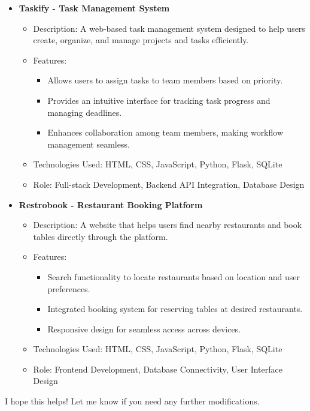 \documentclass[11pt]{article}
\begin{document}
\begin{itemize}
\item \textbf{Taskify - Task Management System}
  \begin{itemize}
  \item Description: A web-based task management system designed to help users create, organize, and manage projects and tasks efficiently.
  \item Features:
    \begin{itemize}
    \item Allows users to assign tasks to team members based on priority.
    \item Provides an intuitive interface for tracking task progress and managing deadlines.
    \item Enhances collaboration among team members, making workflow management seamless.
    \end{itemize}
  \item Technologies Used: HTML, CSS, JavaScript, Python, Flask, SQLite
  \item Role: Full-stack Development, Backend API Integration, Database Design
  \end{itemize}

\item \textbf{Restrobook - Restaurant Booking Platform}
  \begin{itemize}
  \item Description: A website that helps users find nearby restaurants and book tables directly through the platform.
  \item Features:
    \begin{itemize}
    \item Search functionality to locate restaurants based on location and user preferences.
    \item Integrated booking system for reserving tables at desired restaurants.
    \item Responsive design for seamless access across devices.
    \end{itemize}
  \item Technologies Used: HTML, CSS, JavaScript, Python, Flask, SQLite
  \item Role: Frontend Development, Database Connectivity, User Interface Design
  \end{itemize}
\end{itemize}

I hope this helps! Let me know if you need any further modifications.
\end{document}
